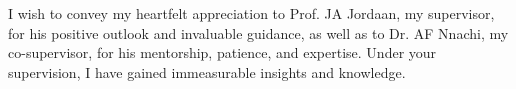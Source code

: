 I wish to convey my heartfelt appreciation to Prof. JA Jordaan, my supervisor, for his positive outlook and invaluable guidance, as well as to Dr. AF Nnachi, my co-supervisor, for his mentorship, patience, and expertise. Under your supervision, I have gained immeasurable insights and knowledge.